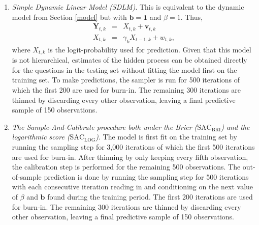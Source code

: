 \documentclass[aoas, preprint]{imsart}
\numberwithin{equation}{section}
\theoremstyle{plain}
\begin{document}
\begin{enumerate}
\item \textit{Simple Dynamic Linear Model (SDLM)}. This is equivalent to the dynamic model from Section \ref{model} but with $\boldsymbol{b} = \boldsymbol{1}$ and $\beta = 1$. Thus,
\begin{eqnarray*}
\boldsymbol{Y}_{t, k} &=&  X_{t, k} + \boldsymbol{v}_{t, k}  \\
X_{t, k} &=& \gamma_k X_{t-1, k} + w_{t, k},
\end{eqnarray*}
where $X_{t,k}$ is the logit-probability used for prediction. Given that this model is not hierarchical, estimates of the hidden process can be obtained directly for the questions in the testing set without fitting the model first on the training set. To make predictions, the sampler is run for 500 iterations of which the first 200 are used for burn-in. The remaining 300 iterations are thinned by discarding every other observation, leaving a final predictive sample of 150 observations. 

\item \textit{The Sample-And-Calibrate procedure both under the Brier ($\text{SAC}_{\text{BRI}}$) and the logarithmic score ($\text{SAC}_{\text{LOG}}$)}. The model is first fit on the training set by running the sampling step for 3,000 iterations of which the first 500 iterations are used for burn-in. After thinning by only keeping every fifth observation, the calibration step is performed for the remaining 500 observations. The out-of-sample prediction is done by running the sampling step for 500 iterations with each consecutive iteration reading in and conditioning on the next value of $\beta$ and $\boldsymbol{b}$ found during the training period. The first 200 iterations are used for burn-in. The remaining 300 iterations are thinned by discarding every other observation, leaving a final predictive sample of 150 observations. 



\end{enumerate}
\end{document}

